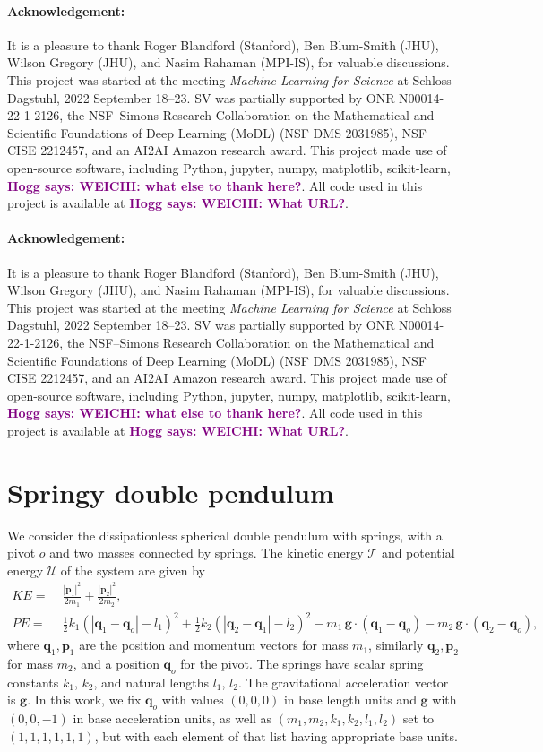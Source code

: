 \documentclass[preprint]{article} %
\renewcommand{\mathcal}[1]{\mathscr{#1}} %
\newcommand{\hogg}[1]{\textcolor{purple}{\textbf{Hogg says: #1}}}
\begin{document}
\newcommand{\ack}{\paragraph{Acknowledgement:}
It is a pleasure to thank
   Roger Blandford (Stanford),
   Ben Blum-Smith (JHU),
   Wilson Gregory (JHU),
   and
   Nasim Rahaman (MPI-IS),
for valuable discussions.
This project was started at the meeting \textit{Machine Learning for Science} at Schloss Dagstuhl, 2022 September 18--23.
SV was partially supported by
   ONR N00014-22-1-2126, 
   the NSF–Simons Research Collaboration on the Mathematical and Scientific Foundations of Deep Learning (MoDL) (NSF DMS 2031985),
   NSF CISE 2212457,
   and
   an AI2AI Amazon research award.
This project made use of open-source software, including Python, jupyter, numpy, matplotlib, scikit-learn, \hogg{WEICHI: what else to thank here?}.
All code used in this project is available at \hogg{WEICHI: What URL?}.
}

\makeatletter
\if@preprint
  \ack
\else
  \if@accepted
    \ack
  \fi
\fi
\makeatother




\appendix
\section{Springy double pendulum}\label{app:pendulum}
We consider the dissipationless spherical double pendulum with springs, with a pivot $o$ and two masses connected by springs. The kinetic energy $\mathcal{T}$ and potential energy $\mathcal{U}$ of the system are given by
\begin{align}
    KE =&\;\frac{|\mathbf{p}_1|^2}{2m_1} +\frac{|\mathbf{p}_2|^2}{2m_2}, \label{eq:energy_T}\\
    PE =&\;\frac12 k_1(|\mathbf{q}_1-\mathbf{q}_o|-l_1)^2 + \frac12 k_2(|\mathbf{q}_2-\mathbf{q}_1|-l_2)^2 
    -m_1\,\mathbf{g}\cdot (\mathbf{q}_1-\mathbf{q}_o)- m_2 \,\mathbf{g}\cdot  (\mathbf{q}_2-\mathbf{q}_o), \label{eq:energy_U}
\end{align}
where $\mathbf{q}_1, \mathbf{p}_1$ are the position and momentum vectors for mass $m_1$, similarly $\mathbf{q}_2, \mathbf{p}_2$ for mass $m_2$, and a position $\mathbf{q}_o$ for the pivot. The springs have scalar spring constants $k_1$, $k_2$, and natural lengths $l_1$, $l_2$. The gravitational acceleration vector is $\mathbf{g}$. 
In this work, we fix $\mathbf{q}_o$ with values $(0,0,0)$ in base length units and $\mathbf{g}$ with $(0,0,-1)$ in base acceleration units, as well as $(m_1, m_2, k_1, k_2, l_1, l_2)$ set to $(1,1,1,1,1,1)$, but with each element of that list having appropriate base units. 
\end{document}
